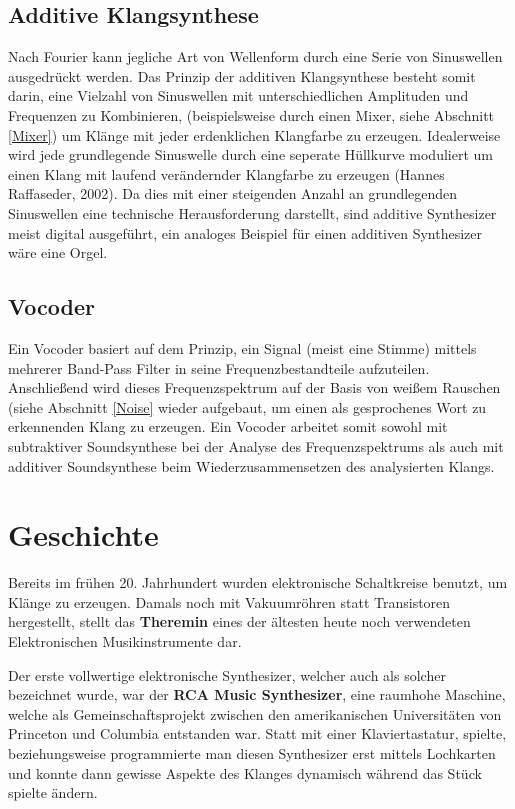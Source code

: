 \subsection{Additive Klangsynthese}
\label{sec:org0e12aeb}
Nach Fourier kann jegliche Art von Wellenform durch eine Serie von Sinuswellen ausgedrückt werden. Das Prinzip der additiven Klangsynthese besteht somit darin, eine Vielzahl von Sinuswellen mit unterschiedlichen Amplituden und Frequenzen zu Kombinieren, (beispielsweise durch einen Mixer, siehe Abschnitt \ref{Mixer}) um Klänge mit jeder erdenklichen Klangfarbe zu erzeugen. Idealerweise wird jede grundlegende Sinuswelle durch eine seperate Hüllkurve moduliert um einen Klang mit laufend verändernder Klangfarbe zu erzeugen (Hannes Raffaseder, 2002). Da dies mit einer steigenden Anzahl an grundlegenden Sinuswellen eine technische Herausforderung darstellt, sind additive Synthesizer meist digital ausgeführt, ein analoges Beispiel für einen additiven Synthesizer wäre eine Orgel.

\subsection{Vocoder}
\label{sec:orgae2bcf8}
Ein Vocoder basiert auf dem Prinzip, ein Signal (meist eine Stimme) mittels mehrerer Band-Pass Filter in seine Frequenzbestandteile aufzuteilen. Anschließend wird dieses Frequenzspektrum auf der Basis von weißem Rauschen (siehe Abschnitt \ref{Noise} wieder aufgebaut, um einen als gesprochenes Wort zu erkennenden Klang zu erzeugen. Ein Vocoder arbeitet somit sowohl mit subtraktiver Soundsynthese bei der Analyse des Frequenzspektrums als auch mit additiver Soundsynthese beim Wiederzusammensetzen des analysierten Klangs.

\section{Geschichte}
\label{sec:org29495f7}
Bereits im frühen 20. Jahrhundert wurden elektronische Schaltkreise benutzt, um Klänge zu erzeugen. Damals noch mit Vakuumröhren statt Transistoren hergestellt, stellt das \textbf{Theremin} eines der ältesten heute noch verwendeten Elektronischen Musikinstrumente dar.

Der erste vollwertige elektronische Synthesizer, welcher auch als solcher bezeichnet wurde, war der \textbf{RCA Music Synthesizer}, eine raumhohe Maschine, welche als Gemeinschaftsprojekt zwischen den amerikanischen Universitäten von Princeton und Columbia entstanden war. Statt mit einer Klaviertastatur, spielte, beziehungsweise programmierte man diesen Synthesizer erst mittels Lochkarten und konnte dann gewisse Aspekte des Klanges dynamisch während das Stück spielte ändern.


